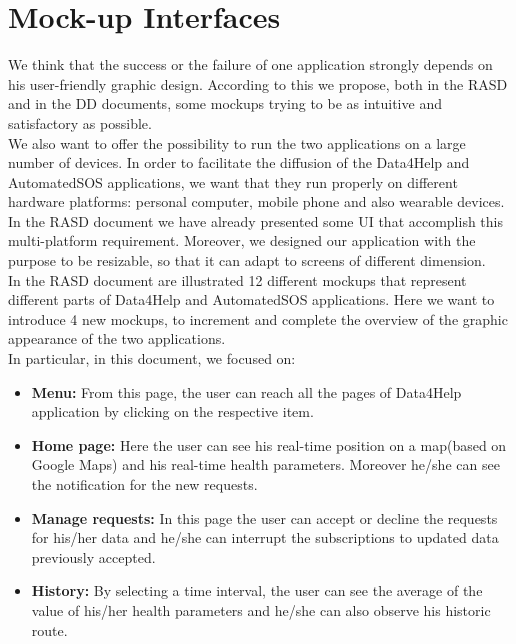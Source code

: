 \hypertarget{MK}{\section{Mock-up Interfaces}}
We think that the success or the failure of one application strongly depends on his user-friendly graphic design. According to this we propose, both in the RASD and in the DD documents, some mockups trying to be as intuitive and satisfactory as possible.\\
We also want to offer the possibility to run the two applications on a large number of devices. 
In order to facilitate the diffusion of the Data4Help and AutomatedSOS applications, we want that they run properly on different hardware platforms: personal computer, mobile phone and also wearable devices. In the RASD document we have already presented some UI that accomplish this multi-platform requirement.
Moreover, we designed our application with the purpose to be resizable, so that it can adapt to screens of different dimension.\\
In the RASD document are illustrated 12 different mockups that represent different parts of Data4Help and AutomatedSOS applications. Here we want to introduce 4 new mockups, to increment and complete the overview of the graphic appearance of the two applications. \\
In particular, in this document, we focused on:
\begin{itemize}
    \item \textbf{Menu:}
    From this page, the user can reach all the pages of Data4Help application by clicking on the respective item.
    \item \textbf{Home page:}
    Here the user can see his real-time position on a map(based on Google Maps) and his real-time health parameters.
    Moreover he/she can see the notification for the new requests.
    \item \textbf{Manage requests:}
    In this page the user can accept or decline the requests for his/her data and he/she can interrupt the subscriptions to updated data previously accepted.
    \item \textbf{History:}
    By selecting a time interval, the user can see the average of the value of his/her health parameters and he/she can also observe his historic route.
\end{itemize}
\clearpage
